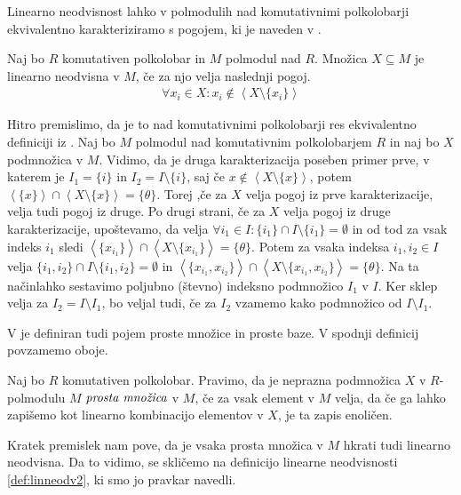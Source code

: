\documentclass[mat1]{fmfdelo}
\newcommand{\pojem}[1]{\ensuremath{\emph{#1}}}
\newcommand{\Gen}[1]{\ensuremath{\left<{#1}\right>}}
\begin{document}
Linearno neodvisnost lahko v polmodulih nad komutativnimi polkolobarji ekvivalentno karakteriziramo s pogojem, ki je naveden v \cite[definicija 2.\,3.\,]{bib:Tanbase}.
\begin{definicija}\label{def:linneodv2}
	Naj bo $R$ komutativen polkolobar in $M$ polmodul nad $R$. Množica $X\subseteq M$ je linearno neodvisna v $M$, če za njo velja naslednji pogoj.
\begin{align}
	\forall x_i\in X: x_i \notin \Gen{X\setminus\{x_i\}}
\end{align}
\end{definicija}

Hitro premislimo, da je to nad komutativnimi polkolobarji res ekvivalentno definiciji iz \cite[2.\,5.\,1.\,]{bib:Gondran}. Naj bo $M$ polmodul nad komutativnim polkolobarjem $R$ in naj bo $X$ podmnožica v $M$. Vidimo, da je druga karakterizacija poseben primer prve, v katerem je $I_1 = \{i\}$ in $I_2 = I\setminus\{i\}$, saj če $x\notin \Gen{X\setminus\{x\}}$, potem $\Gen{\{x\}}\cap \Gen{X\setminus\{x\}} = \{\theta\}$. Torej ,če za $X$ velja pogoj iz prve karakterizacije, velja tudi pogoj iz druge. Po drugi strani, če za $X$ velja pogoj iz druge karakterizacije, upoštevamo, da velja $\forall i_1\in I: \{i_1\} \cap I\setminus\{i_1\} =\emptyset$ in od tod za vsak indeks $i_1$ sledi $\Gen{\{x_{i_1}\}}\cap \Gen{X\setminus \{x_{i_1}\}} = \{\theta\}$. Potem za vsaka indeksa $i_1, i_2\in I$ velja $\{i_1, i_2\}\cap I\setminus \{i_1, i_2\} = \emptyset$ in $\Gen{\{x_{i_1}, x_{i_2}\}}\cap\Gen{X\setminus\{x_{i_1}, x_{i_2}\}} = \{\theta\}$. Na ta načinlahko sestavimo poljubno (števno) indeksno podmnožico $I_1$ v $I$. Ker sklep velja za $I_2 = I\setminus I_1$, bo veljal tudi, če za $I_2$ vzamemo kako podmnožico od $I\setminus I_1$.

V \cite[definicija 2.\,3.\,]{bib:Tanbase} je definiran tudi pojem proste množice in proste baze. V spodnji definicij povzamemo oboje.
\begin{definicija}
Naj bo $R$ komutativen polkolobar. Pravimo, da je neprazna podmnožica $X$ v $R$-polmodulu $M$ \pojem{prosta množica} v $M$, če za vsak element v $M$ velja, da če ga lahko zapišemo kot linearno kombinacijo elementov v $X$, je ta zapis enoličen. 
\end{definicija}

Kratek premislek nam pove, da je vsaka prosta množica v $M$ hkrati tudi linearno neodvisna. Da to vidimo, se skličemo na definicijo linearne neodvisnosti \ref{def:linneodv2}, ki smo jo pravkar navedli.
\end{document}
